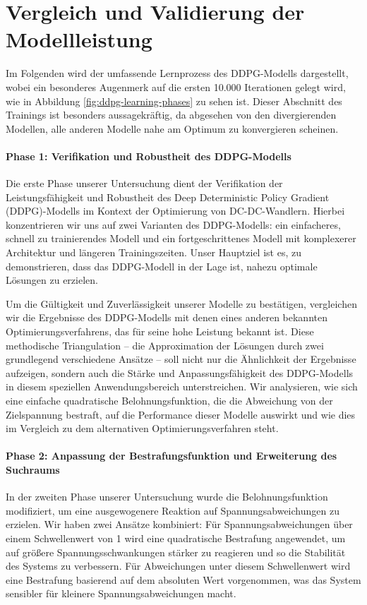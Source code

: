 
\section{Vergleich und Validierung der Modellleistung}


Im Folgenden wird der umfassende Lernprozess des DDPG-Modells dargestellt, wobei ein besonderes Augenmerk auf die ersten 10.000 Iterationen gelegt wird, wie in Abbildung \ref{fig:ddpg-learning-phases} zu sehen ist. Dieser Abschnitt des Trainings ist besonders aussagekräftig, da abgesehen von den divergierenden Modellen, alle anderen Modelle nahe am Optimum zu konvergieren scheinen.


\paragraph{Phase 1: Verifikation und Robustheit des DDPG-Modells}
Die erste Phase unserer Untersuchung dient der Verifikation der Leistungsfähigkeit und Robustheit des Deep Deterministic Policy Gradient (DDPG)-Modells im Kontext der Optimierung von DC-DC-Wandlern. Hierbei konzentrieren wir uns auf zwei Varianten des DDPG-Modells: ein einfacheres, schnell zu trainierendes Modell und ein fortgeschrittenes Modell mit komplexerer Architektur und längeren Trainingszeiten. Unser Hauptziel ist es, zu demonstrieren, dass das DDPG-Modell in der Lage ist, nahezu optimale Lösungen zu erzielen.

Um die Gültigkeit und Zuverlässigkeit unserer Modelle zu bestätigen, vergleichen wir die Ergebnisse des DDPG-Modells mit denen eines anderen bekannten Optimierungsverfahrens, das für seine hohe Leistung bekannt ist. Diese methodische Triangulation – die Approximation der Lösungen durch zwei grundlegend verschiedene Ansätze – soll nicht nur die Ähnlichkeit der Ergebnisse aufzeigen, sondern auch die Stärke und Anpassungsfähigkeit des DDPG-Modells in diesem speziellen Anwendungsbereich unterstreichen. Wir analysieren, wie sich eine einfache quadratische Belohnungsfunktion, die die Abweichung von der Zielspannung bestraft, auf die Performance dieser Modelle auswirkt und wie dies im Vergleich zu dem alternativen Optimierungsverfahren steht.

\paragraph{Phase 2: Anpassung der Bestrafungsfunktion und Erweiterung des Suchraums}
In der zweiten Phase unserer Untersuchung wurde die Belohnungsfunktion modifiziert, um eine ausgewogenere Reaktion auf Spannungsabweichungen zu erzielen. Wir haben zwei Ansätze kombiniert: Für Spannungsabweichungen über einem Schwellenwert von 1 wird eine quadratische Bestrafung angewendet, um auf größere Spannungsschwankungen stärker zu reagieren und so die Stabilität des Systems zu verbessern. Für Abweichungen unter diesem Schwellenwert wird eine Bestrafung basierend auf dem absoluten Wert vorgenommen, was das System sensibler für kleinere Spannungsabweichungen macht.


